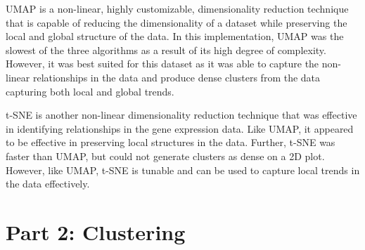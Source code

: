 \documentclass[12pt]{article}
\begin{document}
\begin{enumerate}
    UMAP is a non-linear, highly customizable, dimensionality reduction technique that is capable of reducing the dimensionality of a dataset while preserving the local and global structure of the data. In this implementation, UMAP was the slowest of the three algorithms as a result of its high degree of complexity. However, it was best suited for this dataset as it was able to capture the non-linear relationships in the data and produce dense clusters from the data capturing both local and global trends.

    t-SNE is another non-linear dimensionality reduction technique that was effective in identifying relationships in the gene expression data. Like UMAP, it appeared to be effective in preserving local structures in the data. Further, t-SNE was faster than UMAP, but could not generate clusters as dense on a 2D plot. However, like UMAP, t-SNE is tunable and can be used to capture local trends in the data effectively. 
\end{enumerate}

\section{Part 2: Clustering}

\end{document}
